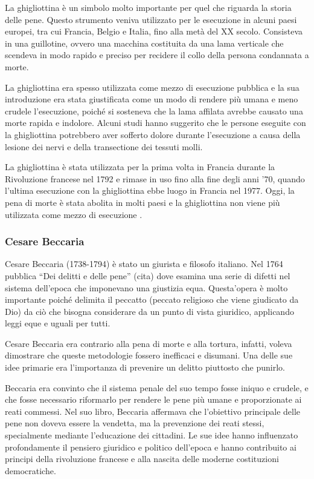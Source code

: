 \documentclass[a4paper, 12pt]{article}
\newcommand{\quotes}[1]{``#1''}
\begin{document}
La ghigliottina è un simbolo molto importante per quel che riguarda
la storia delle pene.
Questo strumento veniva utilizzato per le esecuzione in alcuni paesi europei,
tra cui Francia, Belgio e Italia, fino alla metà del XX secolo.
Consisteva in una guillotine, ovvero una macchina costituita da una lama
verticale che scendeva in modo rapido e preciso per recidere il
collo della persona condannata a morte.

La ghigliottina era spesso utilizzata come mezzo di esecuzione pubblica
e la sua introduzione era stata giustificata come un modo di rendere più umana
e meno crudele l'esecuzione, poiché si sosteneva che la lama affilata
avrebbe causato una morte rapida e indolore.
Alcuni studi hanno suggerito che le persone eseguite con la
ghigliottina potrebbero aver sofferto dolore durante l'esecuzione
a causa della lesione dei nervi e della transectione dei tessuti molli.

La ghigliottina è stata utilizzata per la prima volta in Francia durante la Rivoluzione francese
nel 1792 e rimase in uso fino alla fine degli anni '70,
quando l'ultima esecuzione con la ghigliottina ebbe luogo in Francia nel 1977.
Oggi, la pena di morte è stata abolita in molti paesi e la ghigliottina non viene più
utilizzata come mezzo di esecuzione \cite{ghigliottina}.

\subsubsection{Cesare Beccaria}

Cesare Beccaria (1738-1794) è stato un giurista e filosofo italiano.
Nel 1764 pubblica \quotes{Dei delitti e delle pene} (cita) 
dove esamina una serie di difetti nel sistema dell'epoca che imponevano una giustizia equa.
Questa'opera è molto importante poiché delimita il peccatto (peccato religioso
che viene giudicato da Dio) da ciò che bisogna considerare da un punto di vista giuridico,
applicando leggi eque e uguali per tutti.

Cesare Beccaria era contrario alla pena di morte e alla tortura, infatti,
voleva dimostrare che queste metodologie fossero inefficaci e disumani.
Una delle sue idee primarie era l'importanza di prevenire un delitto piuttosto che punirlo.

Beccaria era convinto che il sistema penale del suo tempo fosse iniquo e crudele,
e che fosse necessario riformarlo per rendere le pene più umane e proporzionate ai reati commessi.
Nel suo libro, Beccaria affermava che l'obiettivo principale delle pene non doveva essere la vendetta,
ma la prevenzione dei reati stessi, specialmente mediante l'educazione dei cittadini.
Le sue idee hanno influenzato profondamente il pensiero giuridico e politico dell'epoca
e hanno contribuito ai principi della rivoluzione francese e alla nascita delle moderne
costituzioni democratiche.
\end{document}
